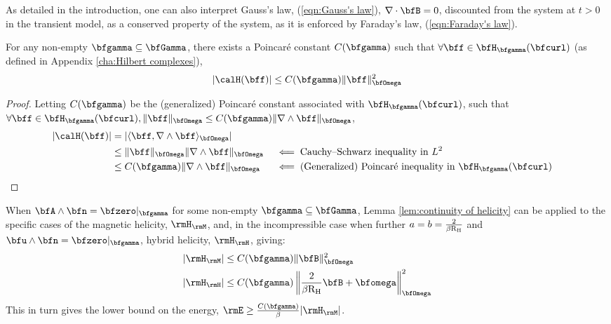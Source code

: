     As detailed in the introduction, one can also interpret Gauss's law, (\ref{eqn:Gauss's law}), $\nabla\cdot\bfB  =  0$, discounted from the system at $t  >  0$ in the transient model, as a conserved property of the system, as it is enforced by Faraday's law, (\ref{eqn:Faraday's law}).
    
    \line
    
    \begin{lemma}\label{lem:continuity of helicity}
        For any non-empty $\bfgamma  \subseteq  \bfGamma$, there exists a Poincaré constant $C(\bfgamma)$ such that $\forall  \bff  \in  \bfH_{\bfgamma}(\bfcurl)$ (as defined in Appendix \ref{cha:Hilbert complexes}),
        \begin{equation}
            |\calH(\bff)|  \leq  C(\bfgamma)\|\bff\|_{\bfOmega}^{2}
        \end{equation}
    \end{lemma}
    \begin{proof}
        Letting $C(\bfgamma)$ be the (generalized) Poincaré constant associated with $\bfH_{\bfgamma}(\bfcurl)$, such that $\forall \bff \in \bfH_{\bfgamma}(\bfcurl), \|\bff\|_{\bfOmega}  \leq  C(\bfgamma)\|\nabla\wedge\bff\|_{\bfOmega}$,
        \begin{align}
            |\calH(\bff)|  &=  |\langle\bff, \nabla\wedge\bff\rangle_{\bfOmega}|  \\
            &\leq  \|\bff\|_{\bfOmega}\|\nabla\wedge\bff\|_{\bfOmega}  &&\impliedby  \text{Cauchy–Schwarz inequality in } L^{2}  \\
            &\leq  C(\bfgamma)\|\nabla\wedge\bff\|_{\bfOmega}  &&\impliedby  \text{(Generalized) Poincaré inequality in } \bfH_{\bfgamma}(\bfcurl)
        \end{align}
    \end{proof}
    
    \begin{corollary}
        When $\bfA\wedge\bfn  =  \bfzero|_{\bfgamma}$ for some non-empty $\bfgamma  \subseteq  \bfGamma$, Lemma \ref{lem:continuity of helicity} can be applied to the specific cases of the magnetic helicity, $\rmH_{\rmM}$, \BA{[Ref]} and, in the incompressible case when further $a  =  b  =  \frac{2}{\beta\mathrm{R}_{\mathrm{H}}}$ and $\bfu\wedge\bfn  =  \bfzero|_{\bfgamma}$, hybrid helicity, $\rmH_{\rmH}$, \cite{LHF22} giving:
        \begin{align}
            |\rmH_{\rmM}|  &\leq  C(\bfgamma)\|\bfB\|_{\bfOmega}^{2}  \\
            |\rmH_{\rmH}|  &\leq  C(\bfgamma)\left\|\frac{2}{\beta\rmRH}\bfB + \bfomega\right\|_{\bfOmega}^{2}
        \end{align}
        This in turn gives the lower bound on the energy, $\rmE  \geq  \frac{C(\bfgamma)}{\beta}|\rmH_{\rmM}|$.
    \end{corollary}

